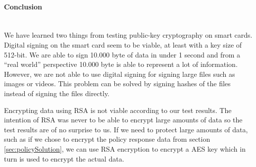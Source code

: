 \paragraph{Conclusion}\mbox{}\\
We have learned two things from testing public-key cryptography on smart cards. Digital signing on the smart card seem to be viable, at least with a key size of 512-bit. We are able to sign 10.000 byte of data in under 1 second and from a ``real world'' perspective 10.000 byte is able to represent a lot of information. However, we are not able to use digital signing for signing large files such as images or videos. This problem can be solved by signing hashes of the files instead of signing the files directly.

Encrypting data using RSA is not viable according to our test results. The intention of RSA was never to be able to encrypt large amounts of data so the test results are of no surprise to us. If we need to protect large amounts of data, such as if we chose to encrypt the policy response data from section \ref{sec:policySolution}, we can use RSA encryption to encrypt a AES key which in turn is used to encrypt the actual data.
